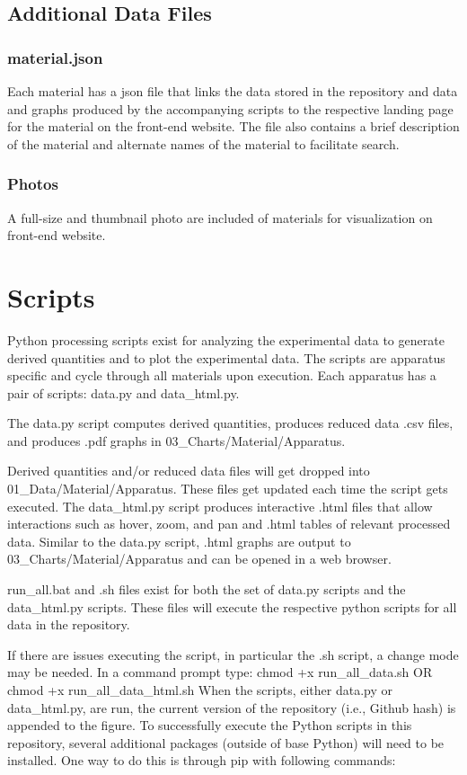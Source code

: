 \documentclass[12pt,oneside]{book}
\begin{document}
\section{Additional Data Files}

\subsection{material.json}
Each material has a json file that links the data stored in the repository and data and graphs produced by the accompanying scripts to the respective landing page for the material on the front-end website. The file also contains a brief description of the material and alternate names of the material to facilitate search.

\subsection{Photos}
A full-size and thumbnail photo are included of materials for visualization on front-end website.


\chapter{Scripts}
\label{sec:scripts}

Python processing scripts exist for analyzing the experimental data to generate derived quantities and to plot the experimental data. The scripts are apparatus specific and cycle through all materials upon execution. Each apparatus has a pair of scripts: data.py and data\_html.py.

The data.py script computes derived quantities, produces reduced data .csv files, and produces .pdf graphs in 03\_Charts/Material/Apparatus.

Derived quantities and/or reduced data files will get dropped into 01\_Data/Material/Apparatus. These files get updated each time the script gets executed.
The data\_html.py script produces interactive .html files that allow interactions such as hover, zoom, and pan and .html tables of relevant processed data. Similar to the data.py script, .html graphs are output to 03\_Charts/Material/Apparatus and can be opened in a web browser.

run\_all.bat and .sh files exist for both the set of data.py scripts and the data\_html.py scripts. These files will execute the respective python scripts for all data in the repository.

If there are issues executing the script, in particular the .sh script, a change mode may be needed. In a command prompt type:
chmod +x run\_all\_data.sh OR chmod +x run\_all\_data\_html.sh
When the scripts, either data.py or data\_html.py, are run, the current version of the repository (i.e., Github hash) is appended to the figure.
To successfully execute the Python scripts in this repository, several additional packages (outside of base Python) will need to be installed. One way to do this is through pip with following commands:
\end{document}
